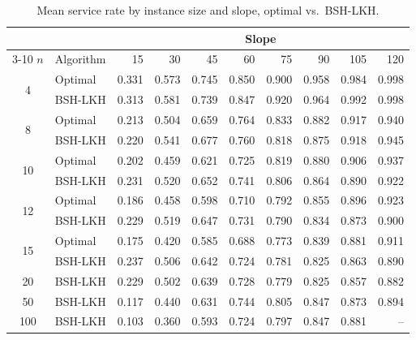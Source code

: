 \documentclass[11pt]{article}
\theoremstyle{plain}
\theoremstyle{definition}
\begin{document}
\begin{table}[t]
	\centering
	\small
	\begin{tabular}{c l rrrrrrrr}
		\toprule
		& & \multicolumn{8}{c}{Slope} \\
		\cmidrule(lr){3-10}
		$n$ & Algorithm & 15 & 30 & 45 & 60 & 75 & 90 & 105 & 120 \\
		\midrule
		\multirow{2}{*}{4} & Optimal & 0.331 & 0.573 & 0.745 & 0.850 & 0.900 & 0.958 & 0.984 & 0.998 \\
		& BSH-LKH & 0.313 & 0.581 & 0.739 & 0.847 & 0.920 & 0.964 & 0.992 & 0.998 \\
		\midrule
		\multirow{2}{*}{8} & Optimal & 0.213 & 0.504 & 0.659 & 0.764 & 0.833 & 0.882 & 0.917 & 0.940 \\
		& BSH-LKH & 0.220 & 0.541 & 0.677 & 0.760 & 0.818 & 0.875 & 0.918 & 0.945 \\
		\midrule
		\multirow{2}{*}{10} & Optimal & 0.202 & 0.459 & 0.621 & 0.725 & 0.819 & 0.880 & 0.906 & 0.937 \\
		& BSH-LKH & 0.231 & 0.520 & 0.652 & 0.741 & 0.806 & 0.864 & 0.890 & 0.922 \\
		\midrule
		\multirow{2}{*}{12} & Optimal & 0.186 & 0.458 & 0.598 & 0.710 & 0.792 & 0.855 & 0.896 & 0.923 \\
		& BSH-LKH & 0.229 & 0.519 & 0.647 & 0.731 & 0.790 & 0.834 & 0.873 & 0.900 \\
		\midrule
		\multirow{2}{*}{15} & Optimal & 0.175 & 0.420 & 0.585 & 0.688 & 0.773 & 0.839 & 0.881 & 0.911 \\
		& BSH-LKH & 0.237 & 0.506 & 0.642 & 0.724 & 0.781 & 0.825 & 0.863 & 0.890 \\
		\midrule
		\multirow{1}{*}{20} & BSH-LKH & 0.229 & 0.502 & 0.639 & 0.728 & 0.779 & 0.825 & 0.857 & 0.882 \\
		\midrule
		\multirow{1}{*}{50} & BSH-LKH & 0.117 & 0.440 & 0.631 & 0.744 & 0.805 & 0.847 & 0.873 & 0.894 \\
		\midrule
		\multirow{1}{*}{100} & BSH-LKH & 0.103 & 0.360 & 0.593 & 0.724 & 0.797 & 0.847 & 0.881 & -- \\
		\bottomrule
	\end{tabular}
	\caption{Mean service rate by instance size and slope, optimal vs.\ BSH-\ac{LKH}.}
	\label{tab:service_rate_slope_grid}
\end{table}

	


\end{document}
